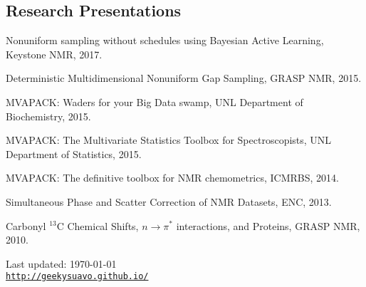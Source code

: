 \documentclass[letterpaper]{article}
\def\footerlink{http://geekysuavo.github.io/}
\renewenvironment{itemize}{
  \begin{list}{}{
    \setlength{\leftmargin}{1.5em}
  }
}{
  \end{list}
}
\begin{document}
\subsection*{Research Presentations}

\begin{itemize}
 \item Nonuniform sampling without schedules using Bayesian Active Learning,
  Keystone NMR, 2017.

 \item Deterministic Multidimensional Nonuniform Gap Sampling,
  GRASP NMR, 2015.

 \item MVAPACK: Waders for your Big Data swamp,
  UNL Department of Biochemistry, 2015.

 \item MVAPACK: The Multivariate Statistics Toolbox for Spectroscopists,
  UNL Department of Statistics, 2015.

 \item MVAPACK: The definitive toolbox for NMR chemometrics, ICMRBS, 2014.

 \item Simultaneous Phase and Scatter Correction of NMR Datasets, ENC, 2013.

 \item Carbonyl $^{13}$C Chemical Shifts, $n\rightarrow\pi^*$ interactions,
  and Proteins, GRASP NMR, 2010.
\end{itemize}

\bigskip

\begin{center}
  \begin{footnotesize}
    Last updated: \today \\
    \href{\footerlink}{\texttt{\footerlink}}
  \end{footnotesize}
\end{center}

\end{document}
